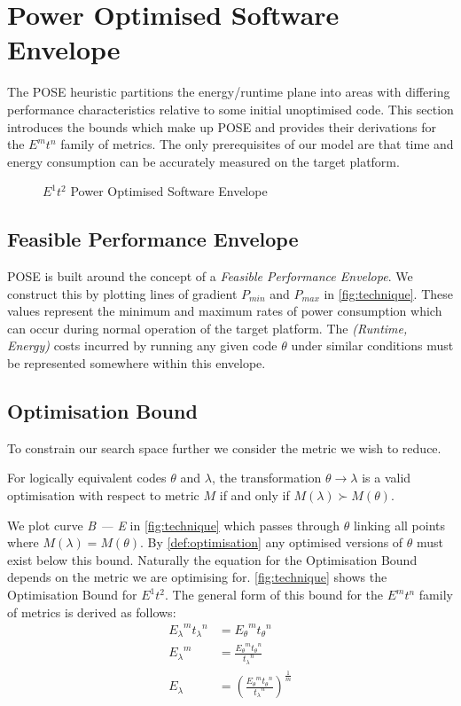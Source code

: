 \section{Power Optimised Software Envelope}
\label{sec:pose}

The POSE heuristic partitions the energy/runtime plane into areas with differing performance characteristics relative to some initial unoptimised code.
This section introduces the bounds which make up POSE and provides their derivations for the $E^mt^n$ family of metrics.
The only prerequisites of our model are that time and energy consumption can be accurately measured on the target platform.

\begin{figure}
\centering

\caption{$E^1t^2$ Power Optimised Software Envelope}
\label{fig:technique}
\end{figure}

\subsection{Feasible Performance Envelope}
POSE is built around the concept of a \emph{Feasible Performance Envelope}.
We construct this by plotting lines of gradient $P_{min}$ and $P_{max}$ in \autoref{fig:technique}.
These values represent the minimum and maximum rates of power consumption which can occur during normal operation of the target platform.
The \textit{(Runtime, Energy)} costs incurred by running any given code $\theta$ under similar conditions must be represented somewhere within this envelope.

\subsection{Optimisation Bound}
To constrain our search space further we consider the metric we wish to reduce.

\begin{definition}
For logically equivalent codes $\theta$ and $\lambda$, the transformation ${\theta \to \lambda}$ is a valid optimisation with respect to metric $M$ if and only if ${M(\lambda) \succ M(\theta)}$.
\label{def:optimisation}
\end{definition}

We plot curve \emph{B --- E} in \autoref{fig:technique} which passes through $\theta$ linking all points where ${M(\lambda) = M(\theta)}$. 
By \autoref{def:optimisation} any optimised versions of $\theta$ must exist below this bound.
Naturally the equation for the Optimisation Bound depends on the metric we are optimising for.
\autoref{fig:technique} shows the Optimisation Bound for $E^1t^2$.
The general form of this bound for the $E^mt^n$ family of metrics is derived as follows:
\begin{align}
 {E_\lambda}^m{t_\lambda}^n &= {E_\theta}^m{t_\theta}^n \nonumber \\
 {E_\lambda}^m &= \frac{{E_\theta}^m{t_\theta}^n}{{t_\lambda}^n} \nonumber \\
  E_\lambda &= (\frac{{E_\theta}^m{t_\theta}^n}{{t_\lambda}^n})^\frac{1}{m}
\label{eq:optimisation}
\end{align}

